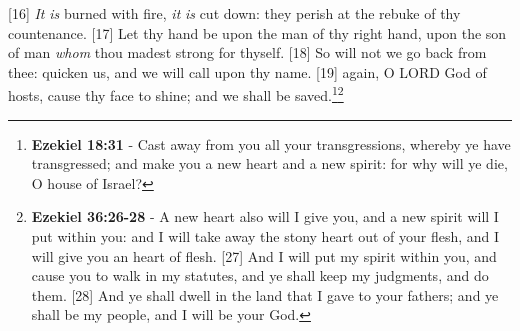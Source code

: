 [16] \textcolor[cmyk]{0.99998,1,0,0}{\emph{It} \emph{is} burned with fire, \emph{it} \emph{is} cut down: they perish at the rebuke of thy countenance.}
[17] \textcolor[cmyk]{0.99998,1,0,0}{Let thy hand be upon the man of thy right hand, upon the son of man \emph{whom} thou madest strong for thyself.}
[18] \textcolor[cmyk]{0.99998,1,0,0}{So will not we go back from thee: quicken us, and we will call upon thy name.}
[19] \textcolor[cmyk]{0.99998,1,0,0}{ again, O LORD God of hosts, cause thy face to shine; and we shall be saved.}\footnote{\textbf{Ezekiel 18:31} - Cast away from you all your transgressions, whereby ye have transgressed; and make you a new heart and a new spirit: for why will ye die, O house of Israel?}\footnote{\textbf{Ezekiel 36:26-28} - A new heart also will I give you, and a new spirit will I put within you: and I will take away the stony heart out of your flesh, and I will give you an heart of flesh. [27] And I will put my spirit within you, and cause you to walk in my statutes, and ye shall keep my judgments, and do them. [28] And ye shall dwell in the land that I gave to your fathers; and ye shall be my people, and I will be your God.}